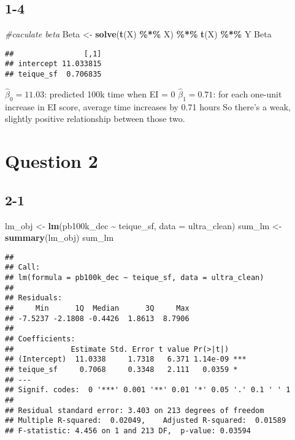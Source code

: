 \documentclass[
]{article}
\newenvironment{Shaded}{\begin{snugshade}}{\end{snugshade}}
\newcommand{\AttributeTok}[1]{\textcolor[rgb]{0.13,0.29,0.53}{#1}}
\newcommand{\CommentTok}[1]{\textcolor[rgb]{0.56,0.35,0.01}{\textit{#1}}}
\newcommand{\FunctionTok}[1]{\textcolor[rgb]{0.13,0.29,0.53}{\textbf{#1}}}
\newcommand{\NormalTok}[1]{#1}
\newcommand{\OtherTok}[1]{\textcolor[rgb]{0.56,0.35,0.01}{#1}}
\newcommand{\SpecialCharTok}[1]{\textcolor[rgb]{0.81,0.36,0.00}{\textbf{#1}}}
\begin{document}
\subsection{1-4}\label{section-3}

\begin{Shaded}
\begin{Highlighting}[]
\CommentTok{\#caculate beta}
\NormalTok{Beta }\OtherTok{\textless{}{-}} \FunctionTok{solve}\NormalTok{(}\FunctionTok{t}\NormalTok{(X) }\SpecialCharTok{\%*\%}\NormalTok{ X) }\SpecialCharTok{\%*\%} \FunctionTok{t}\NormalTok{(X) }\SpecialCharTok{\%*\%}\NormalTok{ Y}
\NormalTok{Beta}
\end{Highlighting}
\end{Shaded}

\begin{verbatim}
##                [,1]
## intercept 11.033815
## teique_sf  0.706835
\end{verbatim}

\(\hat{\beta}_0 = 11.03\): predicted 100k time when EI = 0
\(\hat{\beta}_1 = 0.71\): for each one-unit increase in EI score,
average time increases by 0.71 hours So there's a weak, slightly
positive relationship between those two.

\section{Question 2}\label{question-2}

\subsection{2-1}\label{section-4}

\begin{Shaded}
\begin{Highlighting}[]
\NormalTok{lm\_obj }\OtherTok{\textless{}{-}} \FunctionTok{lm}\NormalTok{(pb100k\_dec }\SpecialCharTok{\textasciitilde{}}\NormalTok{ teique\_sf, }\AttributeTok{data =}\NormalTok{ ultra\_clean)}
\NormalTok{sum\_lm }\OtherTok{\textless{}{-}} \FunctionTok{summary}\NormalTok{(lm\_obj)}
\NormalTok{sum\_lm}
\end{Highlighting}
\end{Shaded}

\begin{verbatim}
## 
## Call:
## lm(formula = pb100k_dec ~ teique_sf, data = ultra_clean)
## 
## Residuals:
##     Min      1Q  Median      3Q     Max 
## -7.5237 -2.1808 -0.4426  1.8613  8.7906 
## 
## Coefficients:
##             Estimate Std. Error t value Pr(>|t|)    
## (Intercept)  11.0338     1.7318   6.371 1.14e-09 ***
## teique_sf     0.7068     0.3348   2.111   0.0359 *  
## ---
## Signif. codes:  0 '***' 0.001 '**' 0.01 '*' 0.05 '.' 0.1 ' ' 1
## 
## Residual standard error: 3.403 on 213 degrees of freedom
## Multiple R-squared:  0.02049,    Adjusted R-squared:  0.01589 
## F-statistic: 4.456 on 1 and 213 DF,  p-value: 0.03594
\end{verbatim}
\end{document}
